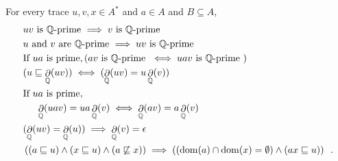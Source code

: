\documentclass[a4paper,UKenglish]{lipics-v2016}
\newcommand{\QQ}{\mathbb{Q}}
\newcommand{\pref}{\sqsubseteq}
\DeclareMathOperator{\dom}{dom}
\DeclareMathOperator{\view}{\partial}
\begin{document}
\begin{lemma}\label{lem:props}
For every trace $u,v,x\in A^*$ and $a\in A$ and $B\subseteq A$,\begin{align}
&\label{eq:primsuff}
\text{$uv$ is $\QQ$-prime $\implies v$ is $\QQ$-prime}\\
&\label{eq:primconcat2}
\text{$u$ and $v$ are $\QQ$-prime $\implies uv$ is $\QQ$-prime}\\
&\label{eq:primsuff2}
\text{If } ua  \text{ is prime},
 (av \text{ is $\QQ$-prime } \iff  uav \text{ is $\QQ$-prime })\\
\label{eq:primsuff4}
&(u\pref \view_\QQ(uv))\iff (\view_\QQ(uv) = u\view_\QQ(v))\\
&
\notag
\text{If } ua  \text{ is prime},\\
&
\hspace{.5cm}
\label{eq:primconcat}
\view_\QQ(uav) = ua\view_\QQ(v)  \iff  \view_\QQ(av) = a \view_\QQ(v)\\
&\label{eq:viewempty}
(\view_\QQ(uv)= \view_\QQ(u))\implies \view_\QQ(v)=\epsilon\\
& \label{comm}
\left((a \pref u) \land (x \pref u) \land (a\not \pref x) \right)
\implies
\left( (\dom(a)\cap \dom(x)=\emptyset) \land (ax \pref u)\right)\enspace.
\end{align}

\end{lemma}
\end{document}
